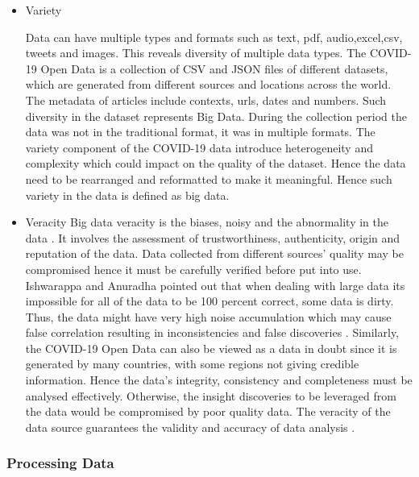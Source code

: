 \documentclass[12pt,letterpaper, twoside]{article}
\begin{document}
\begin{itemize}
    \item Variety
    
    Data can have multiple types and formats such as text, pdf, audio,excel,csv, tweets and images\cite{Johnson et al}. This reveals diversity of multiple data types. The COVID-19 Open Data is a collection of  CSV and JSON files of different datasets, which are generated from different sources and locations across the world.  The metadata of articles include contexts, urls, dates and numbers. Such diversity in the dataset represents Big Data\cite{Johnson et al}. During the collection period the data was not in the traditional format, it was in multiple formats. The variety component of the COVID-19 data introduce heterogeneity and complexity which could impact on the quality of the dataset. Hence the data need to be rearranged  and reformatted to make it meaningful. Hence such variety in the data is defined as big data.
    
    \item Veracity
    Big data veracity is the biases, noisy and the abnormality in the data \cite{Owais}. It involves the assessment of trustworthiness, authenticity, origin and reputation of the data. Data collected from different sources' quality may be compromised hence it must be carefully verified before put into use. Ishwarappa and Anuradha \cite{Ishwarappa} pointed out that when dealing with large data its impossible for all of the data to be 100 percent correct, some data is dirty. Thus, the data might have very high noise accumulation which may cause false correlation resulting in inconsistencies and false discoveries \cite{Grolinger}.  Similarly, the COVID-19 Open Data can also be viewed as a data in doubt since it is generated by many countries, with some regions not giving credible information. Hence the data’s integrity, consistency and completeness must be analysed effectively. Otherwise, the insight discoveries to be leveraged from the data would be compromised by poor quality data. The veracity of the data source guarantees the validity and accuracy of data analysis \cite{Ishwarappa}.
\end{itemize}

\subsubsection{Processing Data}
\end{document}
